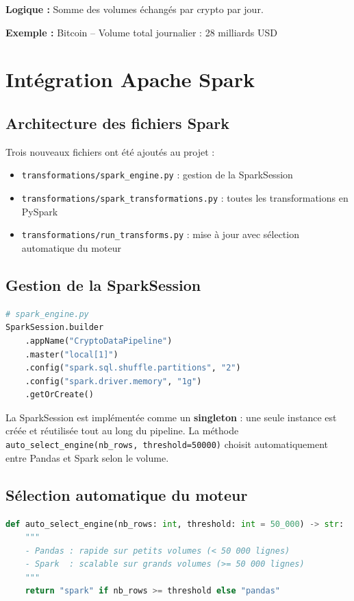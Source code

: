 \documentclass[12pt,a4paper]{article}
\begin{document}
\textbf{Logique :} Somme des volumes échangés par crypto par jour.

\textbf{Exemple :} Bitcoin -- Volume total journalier : 28 milliards USD

\section{Intégration Apache Spark}

\subsection{Architecture des fichiers Spark}

Trois nouveaux fichiers ont été ajoutés au projet :

\begin{itemize}
    \item \texttt{transformations/spark\_engine.py} : gestion de la SparkSession
    \item \texttt{transformations/spark\_transformations.py} : toutes les transformations en PySpark
    \item \texttt{transformations/run\_transforms.py} : mise à jour avec sélection automatique du moteur
\end{itemize}

\subsection{Gestion de la SparkSession}

\begin{lstlisting}[language=Python]
# spark_engine.py
SparkSession.builder
    .appName("CryptoDataPipeline")
    .master("local[1]")
    .config("spark.sql.shuffle.partitions", "2")
    .config("spark.driver.memory", "1g")
    .getOrCreate()
\end{lstlisting}

La SparkSession est implémentée comme un \textbf{singleton} : une seule instance est créée et réutilisée tout au long du pipeline. La méthode \texttt{auto\_select\_engine(nb\_rows, threshold=50000)} choisit automatiquement entre Pandas et Spark selon le volume.

\subsection{Sélection automatique du moteur}

\begin{lstlisting}[language=Python]
def auto_select_engine(nb_rows: int, threshold: int = 50_000) -> str:
    """
    - Pandas : rapide sur petits volumes (< 50 000 lignes)
    - Spark  : scalable sur grands volumes (>= 50 000 lignes)
    """
    return "spark" if nb_rows >= threshold else "pandas"
\end{lstlisting}
\end{document}
